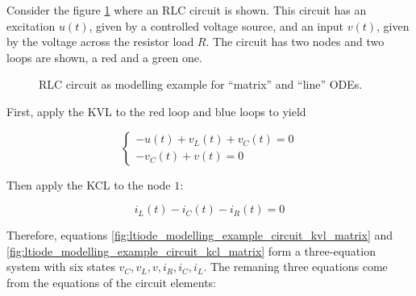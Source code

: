 \begin{example}\label{example:rlc_circuit_matrix_ode} %
	Consider the figure \ref{fig:rlc_matrixline_example} where an RLC circuit is shown. This circuit has an excitation $u(t)$, given by a controlled voltage source, and an input $v(t)$, given by the voltage across the resistor load $R$. The circuit has two nodes and two loops are shown, a red and a green one.

\begin{figure}[htb!]
\centering
{}
	\caption{RLC circuit as modelling example for ``matrix'' and ``line'' ODEs.}
	\label{fig:rlc_matrixline_example}
\end{figure} %

	First, apply the KVL to the red loop and blue loops to yield

\begin{equation}
	\left\{\begin{array}{l}
		-u(t) + v_L(t) + v_C(t) = 0 \\[3mm]
		-v_C(t) + v(t) = 0
	\end{array}\right. \label{fig:ltiode_modelling_example_circuit_kvl_matrix}
\end{equation}

	Then apply the KCL to the node $1$:

\begin{equation} i_L(t) - i_C(t) - i_R(t) = 0 \label{fig:ltiode_modelling_example_circuit_kcl_matrix} \end{equation}

	Therefore, equations \eqref{fig:ltiode_modelling_example_circuit_kvl_matrix} and \eqref{fig:ltiode_modelling_example_circuit_kcl_matrix} form a three-equation system with six states $v_C,v_L,v,i_R,i_C,i_L$. The remaning three equations come from the equations of the circuit elements:


\end{example}
